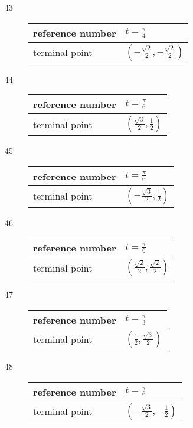 \documentclass{exam}
\begin{document}
\begin{description}
      \item[43]
        \begin{tabular}[H]{ll}
          \toprule
          reference number & $t = \frac{\pi}{4}$ \\
          \midrule
          terminal point   & $\left( - \frac{\sqrt{2}}{2}, - \frac{\sqrt{2}}{2} \right)$ \\
          \bottomrule
        \end{tabular}

      \item[44]
        \begin{tabular}[H]{ll}
          \toprule
          reference number & $t = \frac{\pi}{6}$ \\
          \midrule
          terminal point   & $\left( \frac{\sqrt{3}}{2}, \frac{1}{2} \right)$ \\
          \bottomrule
        \end{tabular}

      \item[45]
        \begin{tabular}[H]{ll}
          \toprule
          reference number & $t = \frac{\pi}{6}$ \\
          \midrule
          terminal point   & $\left( - \frac{\sqrt{3}}{2}, \frac{1}{2} \right)$ \\
          \bottomrule
        \end{tabular}

      \item[46]
        \begin{tabular}[H]{ll}
          \toprule
          reference number & $t = \frac{\pi}{6}$ \\
          \midrule
          terminal point   & $\left( \frac{\sqrt{2}}{2}, \frac{\sqrt{2}}{2} \right)$ \\
          \bottomrule
        \end{tabular}

      \item[47]
        \begin{tabular}[H]{ll}
          \toprule
          reference number & $t = \frac{\pi}{3}$ \\
          \midrule
          terminal point   & $\left( \frac{1}{2}, \frac{\sqrt{3}}{2} \right)$ \\
          \bottomrule
        \end{tabular}

      \item[48]
        \begin{tabular}[H]{ll}
          \toprule
          reference number & $t = \frac{\pi}{6}$ \\
          \midrule
          terminal point   & $\left( - \frac{\sqrt{3}}{2}, - \frac{1}{2} \right)$ \\
          \bottomrule
        \end{tabular}


\end{description}
\end{document}

